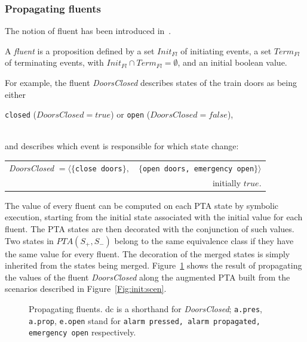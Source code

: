 \subsubsection{Propagating fluents}

The notion of fluent has been introduced in~\cite{Giannakopoulou:2003}.

\begin{definition}[Fluent]
A \emph{fluent} 
is a proposition defined by a set $Init_{Fl}$ of initiating events, a set $Term_{Fl}$ of 
terminating events, with $Init_{Fl}\cap Term_{Fl} = \emptyset$, and an initial boolean value.
\end{definition}

\noindent
For example, the fluent \emph{DoorsClosed} describes states of the train doors as being either \\
\centerline{\texttt{closed} ($DoorsClosed = true$) or \texttt{open} ($DoorsClosed = false$),} \\
and describes which event is responsible for which state change:

\hspace*{-.5cm}
\begin{small}
\begin{tabular}{lr}
\emph{DoorsClosed} $=\langle\{$\texttt{close doors}$\},$ &$\{$\texttt{open doors, emergency open}$\}\rangle$\\
&initially $true$.\\
\end{tabular}
\end{small}

The value of every fluent can be computed on each PTA state by symbolic execution, starting from the initial state associated with the initial value for each fluent. The PTA states are then decorated with the conjunction of such values. Two states in $PTA(S_+, S_-)$ belong to the same equivalence class if they have the same value for every fluent. The decoration of the merged states is simply inherited from the states being merged. Figure~\ref{Fig:fluents} shows the result of propagating the values of the fluent \emph{DoorsClosed} along the augmented PTA built from the scenarios described in Figure~\ref{Fig:init:scen}.

\begin{figure}[H]
\centering
{}
\caption{Propagating fluents\label{Fig:fluents}. {\small dc is a shorthand for \emph{DoorsClosed}; \texttt{a.pres}, \texttt{a.prop}, \texttt{e.open} stand for \texttt{alarm pressed, alarm propagated, emergency open} respectively}.}
\end{figure}

